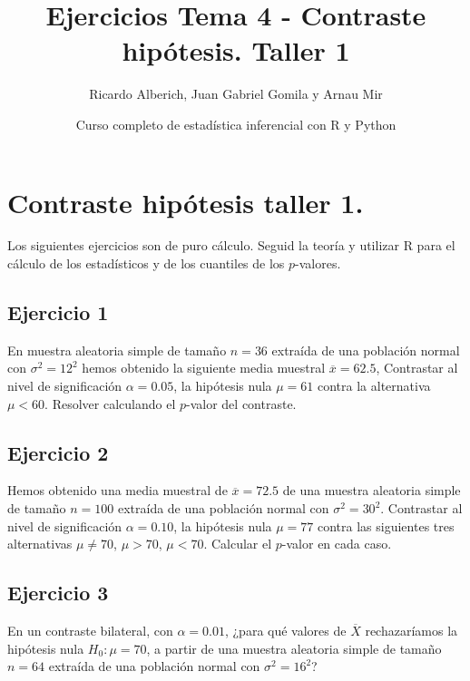 \documentclass[
]{article}
\title{Ejercicios Tema 4 - Contraste hipótesis. Taller 1}
\author{Ricardo Alberich, Juan Gabriel Gomila y Arnau Mir}
\date{Curso completo de estadística inferencial con R y Python}
\begin{document}
\maketitle

{
\hypersetup{linkcolor=blue}
\setcounter{tocdepth}{2}
\tableofcontents
}
\hypertarget{contraste-hipuxf3tesis-taller-1.}{%
\section{Contraste hipótesis taller
1.}\label{contraste-hipuxf3tesis-taller-1.}}

Los siguientes ejercicios son de puro cálculo. Seguid la teoría y
utilizar R para el cálculo de los estadísticos y de los cuantiles de los
\(p\)-valores.

\hypertarget{ejercicio-1}{%
\subsection{Ejercicio 1}\label{ejercicio-1}}

En muestra aleatoria simple de tamaño \(n=36\) extraída de una población
normal con \(\sigma^2=12^2\) hemos obtenido la siguiente media muestral
\(\overline{x}=62.5\), Contrastar al nivel de significación
\(\alpha=0.05\), la hipótesis nula \(\mu=61\) contra la alternativa
\(\mu<60\). Resolver calculando el \(p\)-valor del contraste.

\hypertarget{ejercicio-2}{%
\subsection{Ejercicio 2}\label{ejercicio-2}}

Hemos obtenido una media muestral de \(\overline{x}=72.5\) de una
muestra aleatoria simple de tamaño \(n=100\) extraída de una población
normal con \(\sigma^2=30^2\). Contrastar al nivel de significación
\(\alpha=0.10\), la hipótesis nula \(\mu=77\) contra las siguientes tres
alternativas \(\mu\not= 70\), \(\mu>70\), \(\mu<70\). Calcular el
\(p\)-valor en cada caso.

\hypertarget{ejercicio-3}{%
\subsection{Ejercicio 3}\label{ejercicio-3}}

En un contraste bilateral, con \(\alpha=0.01\), ¿para qué valores de
\(\overline{X}\) rechazaríamos la hipótesis nula \(H_{0}:\mu=70\), a
partir de una muestra aleatoria simple de tamaño \(n=64\) extraída de
una población normal con \(\sigma^2=16^2\)?
\end{document}
